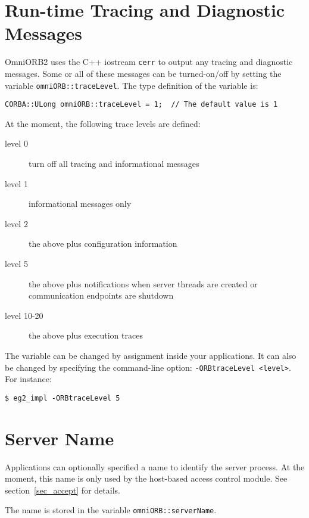 \documentclass[11pt,twoside,onecolumn]{book}
\begin{document}
\section{Run-time Tracing and Diagnostic Messages}
\label{rttrace}

OmniORB2 uses the C++ iostream {\tt cerr} to output any tracing and
diagnostic messages. Some or all of these messages can be turned-{on/off} by
setting the variable {\tt omniORB::traceLevel}. The type definition of
the variable is:

{\small
\begin{verbatim}
CORBA::ULong omniORB::traceLevel = 1;  // The default value is 1
\end{verbatim}
}

At the moment, the following trace levels are defined:

\begin{description}

\item[level 0] turn off all tracing and informational messages
\item[level 1] informational messages only
\item[level 2] the above plus configuration information
\item[level 5] the above plus notifications when server threads are created
or communication endpoints are shutdown
\item[level 10-20] the above plus execution traces

\end{description}

The variable can be changed by assignment inside your applications. It can
also be changed by specifying the command-line option: {\tt -ORBtraceLevel
<level>}. For instance:

{\small
\begin{verbatim}
$ eg2_impl -ORBtraceLevel 5
\end{verbatim}
}


\section{Server Name}
\label{sec_servername}

Applications can optionally specified a name to identify the server
process. At the moment, this name is only used by the host-based access
control module. See section~\ref{sec_accept} for details.

The name is stored in the variable {\tt omniORB::serverName}.
\end{document}
